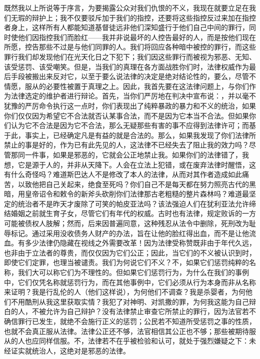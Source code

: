 既然我以上所说等于序言，为要揭露公众对我们仇恨的不义，我现在就要立足在我们无瑕的辩护上；我不仅要驳斥加于我们的指控，还要将这些指控反过来加在指控者身上，这样所有人都能知道基督徒远非他们深知盛行于他们自己中间的罪行，同时使他们因指控我们而脸红——我并非说最坏的人控告最好的人，而是按他们现在所愿，控告那些不过是与他们同罪的人。我们将回应各种暗中被控的罪行，而这些罪行我们却发现他们在光天化日之下犯下；我们因这些罪行而被视为邪恶、无知、该受惩罚、该受嘲笑。但是，当我们的真理在各方面战胜你们时，法律权威作为最后手段被搬出来反对它，以至于要么说法律的决定是绝对结论性的，要么，尽管不情愿，服从的必要性被置于真理之上。因此，我首先要在这法律问题上，与你们作为法律选定的维护者进行辩论。首先，当你们严厉地在判决中宣布说：，并以毫不犹豫的严厉命令执行这一点时，你们表现出了纯粹暴政的暴力和不义的统治，如果你们仅仅因为希望它不合法就否认某事合法，而不是因为它本当不合法。但如果你们认为它不合法是因为它不合法，那么无疑那些有害的事不应得到法律许可；而基于此，事实上，已经确定凡是有益的就是合法的。那么，如果我发现了你们法律所禁止的事是好的，作为已有此先见的人，这法律不已经失去了阻止我的效力吗？尽管那同一件事，如果是邪恶的，它就会公正地禁止我。如果你们的法律错了，我想，它是源于人的，并非从天降下。人会在立法上犯错，或在废弃法律时醒悟，这有什么奇怪吗？难道斯巴达人不是修改了本人的法律，从而对其作者造成如此痛苦，以致他把自己关起来，绝食至死吗？你们自己不是每天都在努力照亮古代的黑暗，用皇帝诏令和敕令的新斧头砍削你们法律那古老粗糙的整片森林吗？难道最坚定的统治者不是昨天才废除了可笑的帕皮亚法吗？该法强迫人们在犹利亚法允许缔结婚姻之前就生育子女，尽管它们有年代的权威。古时也有法律，规定败诉的一方可能被债权人肢解；然而，后来因普遍同意，这种残忍从法令中删除，死刑改为耻辱标记。通过采用没收债务人财产的办法，旨在让他的脸红得出血，而不是让他流血。有多少法律仍隐藏在视线之外需要改革！因为法律受称赞既非由于年代久远，也非由于立法者的尊贵，而仅仅因为它们公正；因此，当它们的不义被认识到时，即使它们定罪，也理当被谴责。我们为何说它们不义？不，如果它们惩罚纯粹的名称，我们大可以称它们为不理性的。但如果它们惩罚行为，为什么在我们的事例中，它们仅凭名称就惩罚行为，而在其他事例中，它们必须从行为本身而非从名称来证明？我是行乱伦的人（他们这样说），为何他们不调查？我是杀婴者，为何他们不用酷刑从我这里获取实情？我犯了对神明、对凯撒的罪，为何我这能为自己辩白的人，不被允许为自己辩护？没有法律禁止审查它所禁止的罪行，因为法官若不确信罪行已发生，就绝不会施行正义的惩罚；公民若不知道所受惩罚之事的性质，也就不会真正服从法律。法律公正还不够，法官相信其公正也不够；那些被期待服从的人也应同样信服。不，法律若不在乎被检验和认可，就处于强烈嫌疑之下：未经证实就统治人，这绝对是邪恶的法律。\par

